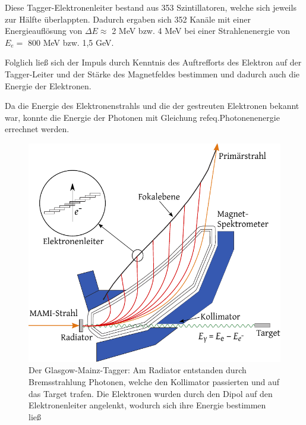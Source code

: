\documentclass[a4paper,11pt,oneside,final,german,openbib,pdftex]{scrbook}
\begin{document}
{ Diese Tagger-Elektronenleiter bestand aus 353 Szintillatoren, welche sich jeweils zur H\"alfte \"uberlappten.
 Dadurch ergaben sich 352 Kan\"ale mit einer Energieaufl\"osung von $\Delta E \approx$  2 MeV bzw. 4 MeV bei einer Strahlenenergie von $E_e=$ 800 MeV bzw. 1,5 GeV. 
 
 Folglich lie{\ss} sich der Impuls durch Kenntnis des Auftrefforts des Elektron auf der Tagger-Leiter und der St\"arke des Magnetfeldes bestimmen und dadurch auch die Energie der Elektronen.
 
 Da die Energie des Elektronenstrahls und die der gestreuten Elektronen bekannt war, konnte die Energie der Photonen mit Gleichung ref{eq.Photonenenergie} errechnet werden.
\newline 
\begin{figure}[h!]
	\begin{center}
	\includegraphics{TAGGER}
	
	\caption{Der Glasgow-Mainz-Tagger: Am Radiator entstanden durch Bremsstrahlung Photonen, welche den Kollimator passierten und auf das Target trafen. Die Elektronen wurden durch den Dipol auf den Elektronenleiter angelenkt, wodurch sich ihre Energie bestimmen lie{\ss}\cite{Un08}}
\label{fig.TAGGER}	
\end{center}
\end{figure}
 
}
\end{document}
